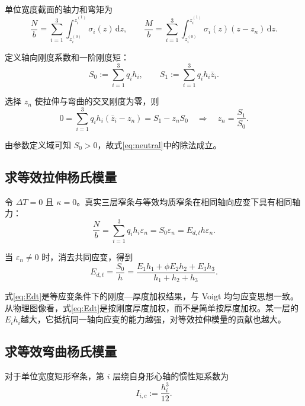 \documentclass[draft,12pt,a4paper]{ctexart}
\theoremstyle{definition}
\newcommand{\diff}{\mathrm{d}}
\begin{document}
单位宽度截面的轴力和弯矩为
\begin{equation}\label{eq:force-moment}
\frac Nb=\sum_{i=1}^{3}\int_{z_i^{(0)}}^{z_i^{(1)}}\sigma_i(z)\,\diff z,
\qquad
\frac Mb=\sum_{i=1}^{3}\int_{z_i^{(0)}}^{z_i^{(1)}}\sigma_i(z)(z-z_n)\,\diff z.
\end{equation}

定义轴向刚度系数和一阶刚度矩：
\begin{equation}\label{eq:S0}
S_0:=\sum_{i=1}^{3}q_ih_i,
\qquad
S_1:=\sum_{i=1}^{3}q_ih_i\bar z_i.
\end{equation}

选择 $z_n$ 使拉伸与弯曲的交叉刚度为零，则
\begin{equation}\label{eq:neutral}
0=\sum_{i=1}^{3}q_ih_i(\bar z_i-z_n)
=S_1-z_nS_0
\quad\Rightarrow\quad
\boxed{z_n=\frac{S_1}{S_0}}.
\end{equation}

由参数定义域可知 $S_0>0$，故式\eqref{eq:neutral}中的除法成立。

\subsection{求等效拉伸杨氏模量}

令 $\Delta T=0$ 且 $\kappa=0$。真实三层窄条与等效均质窄条在相同轴向应变下具有相同轴力：
\begin{equation}
\frac Nb
=\sum_{i=1}^{3}q_ih_i\varepsilon_n
=S_0\varepsilon_n
=E_{d,t}h\varepsilon_n.
\end{equation}

当 $\varepsilon_n\ne0$ 时，消去共同应变，得到
\begin{equation}\label{eq:Edt}
\boxed{
E_{d,t}=\frac{S_0}{h}
=\frac{E_1h_1+\phi E_2h_2+E_3h_3}{h_1+h_2+h_3}
}.
\end{equation}

式\eqref{eq:Edt}是等应变条件下的刚度—厚度加权结果，与 Voigt 均匀应变思想一致。从物理图像看，式\eqref{eq:Edt}是按刚度厚度加权，而不是简单按厚度加权。某一层的$E_i h_i$越大，它抵抗同一轴向应变的能力越强，对等效拉伸模量的贡献也越大。

\subsection{求等效弯曲杨氏模量}

对于单位宽度矩形窄条，第 $i$ 层绕自身形心轴的惯性矩系数为
\begin{equation}
I_{i,c}:=\frac{h_i^3}{12}.
\end{equation}
\end{document}
